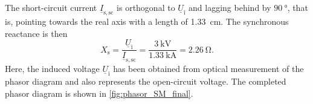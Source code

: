 \begin{solutionblock}
    The short-circuit current $\underline{I}_\mathrm{s,sc}$ is orthogonal to $\underline{U}_\mathrm{i}$ and lagging behind by $\SI{90}{\degree}$, that is, pointing towards the real axis with a length of \SI{1.33}{\cm}. The synchronous reactance is then
    $$X_\mathrm{s} = \frac{\underline{U}_\mathrm{i}}{\underline{I}_\mathrm{s,sc}} = \frac{\SI{3}{\kilo\volt}}{\SI{1.33}{\kilo\ampere}} = \SI{2.26}{\ohm}.$$
    Here, the induced voltage $\underline{U}_\mathrm{i}$ has been obtained from optical measurement of the phasor diagram and also represents the open-circuit voltage. The completed phasor diagram is shown in \autoref{fig:phasor_SM_final}.
\end{solutionblock}



